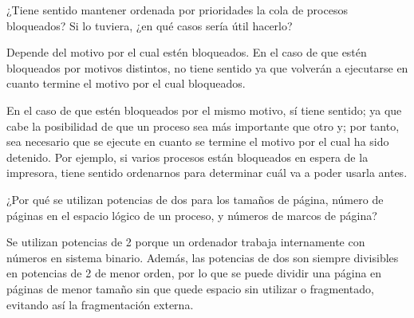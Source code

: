 \begin{ejercicio}\label{ej:2.Ejercicio13}
    ¿Tiene sentido mantener ordenada por prioridades la cola de procesos bloqueados? Si lo tuviera, ¿en qué casos sería útil hacerlo?

    Depende del motivo por el cual estén bloqueados. En el caso de que estén bloqueados por motivos distintos, no tiene sentido ya que volverán a ejecutarse en cuanto termine el motivo por el cual bloqueados.

    En el caso de que estén bloqueados por el mismo motivo, sí tiene sentido; ya que cabe la posibilidad de que un proceso sea más importante que otro y; por tanto, sea necesario que se ejecute en cuanto se termine el motivo por el cual ha sido detenido. Por ejemplo, si varios procesos están bloqueados en espera de la impresora, tiene sentido ordenarnos para determinar cuál va a poder usarla antes.
\end{ejercicio}

\begin{ejercicio}\label{ej:2.Ejercicio14}
    ¿Por qué se utilizan potencias de dos para los tamaños de página, número de páginas en el espacio lógico de un proceso, y números de marcos de página?

    Se utilizan potencias de 2 porque un ordenador trabaja internamente con números en sistema binario. Además, las potencias de dos son siempre divisibles en potencias de 2 de menor orden, por lo que se puede dividir una página en páginas de menor tamaño sin que quede espacio sin utilizar o fragmentado, evitando así la fragmentación externa.
    
\end{ejercicio}

